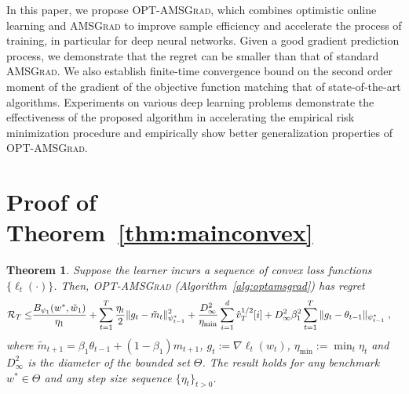 \documentclass[twoside]{article}
\newtheorem*{Theorem*}{Theorem}
\begin{document}
In this paper, we propose \textsc{OPT-AMSGrad}, which combines optimistic online learning and \textsc{AMSGrad} to improve sample efficiency and
accelerate the process of training, in particular for deep neural networks. 
Given a good gradient prediction process, we demonstrate that the regret can be smaller than that of standard \textsc{AMSGrad}.
We also establish finite-time convergence bound on the second order moment of the gradient of the objective function matching that of state-of-the-art algorithms.
Experiments on various deep learning problems demonstrate the effectiveness of the proposed algorithm in accelerating the empirical risk minimization procedure and empirically show better generalization properties of \textsc{OPT-AMSGrad}.






\clearpage

\onecolumn
\appendix


\section{Proof of Theorem~\ref{thm:mainconvex}}\label{app:thmmainconvex}
\begin{Theorem*}
Suppose the learner incurs a sequence of convex loss functions $\{ \ell_{t}(\cdot) \}$.
Then,  \textsc{OPT-AMSGrad} (Algorithm~\ref{alg:optamsgrad}) has regret 
\begin{equation}\notag
\begin{aligned}
\mathcal{R}_T \leq &   \frac{ B_{\psi_1}(w^*, \tilde{w}_{1})}{\eta_1}
+ \sum_{t=1}^T\frac{\eta_t}{2} \| g_t - \tilde{m}_t  \|_{\psi_{t-1}^*}^2  + \frac{D_{\infty}^2}{\eta_{\min}}  \sum_{i=1}^d \hat{v}_{T}^{1/2}[i] + D_{\infty}^2\beta_1^2   \sum_{t=1}^T  \| g_t - \theta_{t-1}  \|_{\psi_{t-1}^*}\;,
\end{aligned}
\end{equation}
where $ \tilde{m}_{t+1}  = \beta_1 \theta_{t-1} +(1-\beta_1) m_{t+1}$, $g_{t}:= \nabla \ell_{t}(w_t)$, $\eta_{{\min}} := \min_{{t}} \eta_{t}$ and $D_{\infty}^2$ is the diameter of the bounded set $\Theta$.
The result holds for any benchmark $w^{*} \in \Theta$ and any step size sequence $\{ \eta_t \}_{t>0}$.
\end{Theorem*}
\end{document}
